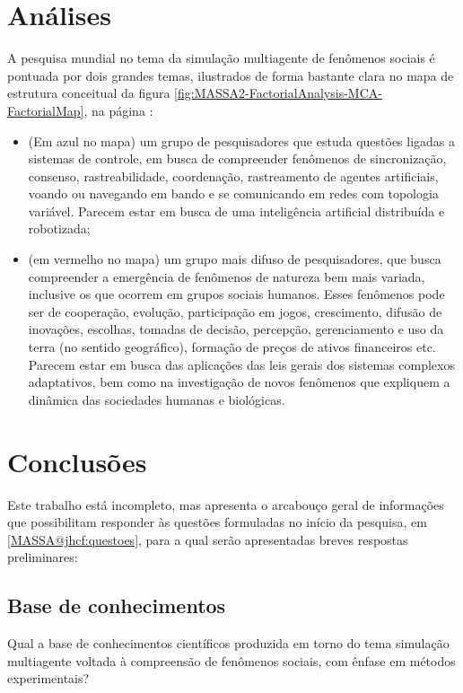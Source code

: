 \section{Análises\label{MASSA2:Analises}}

A pesquisa mundial no tema da simulação multiagente de fenômenos sociais é pontuada por dois grandes temas, ilustrados de forma bastante clara no mapa de estrutura conceitual da figura \ref{fig:MASSA2-FactorialAnalysis-MCA-FactorialMap}, na página \pageref{fig:MASSA2-FactorialAnalysis-MCA-FactorialMap}:
\begin{itemize}
    \item 
(Em azul no mapa) um grupo de pesquisadores que estuda questões ligadas a sistemas de controle, em busca de compreender fenômenos de sincronização, consenso, rastreabilidade, coordenação, rastreamento de agentes artificiais, voando ou navegando em bando e se comunicando em redes com topologia variável. Parecem estar em busca de uma inteligência artificial distribuída e robotizada;
\item (em vermelho no mapa) um grupo mais difuso de pesquisadores, que busca compreender a emergência de fenômenos de natureza bem mais variada, inclusive os que ocorrem em grupos sociais humanos. Esses fenômenos pode ser de cooperação, evolução, participação em jogos, crescimento, difusão de inovações, escolhas, tomadas de decisão, percepção, gerenciamento e uso da terra (no sentido geográfico), formação de preços de ativos financeiros etc. Parecem estar em busca das aplicações das leis gerais dos sistemas complexos adaptativos, bem como na investigação de novos fenômenos que expliquem a dinâmica das sociedades humanas e biológicas.
\end{itemize}

\section{Conclusões}

Este trabalho está incompleto, mas apresenta o arcabouço geral de informações que possibilitam responder às  questões formuladas no início da pesquisa, em \ref{MASSA@jhcf:questoes}, para a qual serão apresentadas breves respostas preliminares:

\subsection{Base de conhecimentos}

Qual a base de conhecimentos científicos produzida em torno do tema simulação multiagente voltada à compreensão de fenômenos sociais, com ênfase em métodos experimentais?
 
